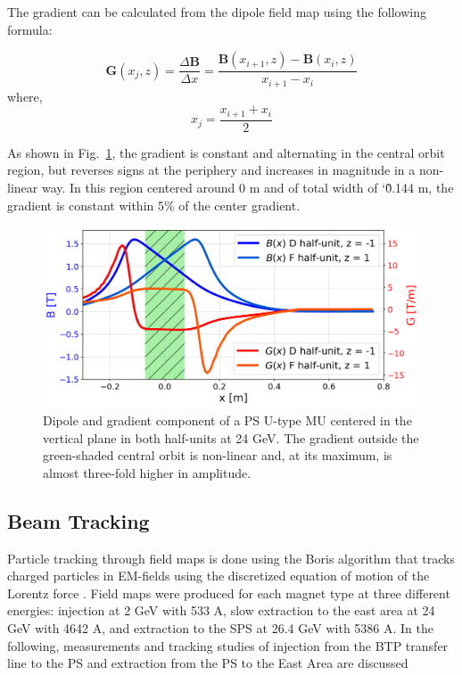 \documentclass[a4paper,
               biblatex,     %
               keeplastbox,   %
               ]{jacow}
\begin{document}
The gradient can be calculated from the dipole field map using the following formula:
 
$$ \boldsymbol{G}(x_{j},z) = \frac{\Delta\boldsymbol{B}}{\Delta x} = \frac{\boldsymbol{B}(x_{i+1},z) - \boldsymbol{B}(x_{i},z)}{x_{i+1}-x_{i}} $$
where,
$$ x_{j} = \frac{x_{i+1} + x_{i}}{{2}} $$
 
 As shown in Fig.~\ref{fig:gradient_field}, the gradient is constant and alternating in the central orbit region, but reverses signs at the periphery and increases in magnitude in a non-linear way.  In this region centered around 0 m and of total width of \char`\~0.144 m, the gradient is constant within 5\% of the center gradient.


\begin{figure}[!htb]
   \centering
   \includegraphics*[width=1.0\columnwidth, trim={0 0 0 0cm},clip]{Main_field_B_G_with_mask.png}
   \caption{Dipole and gradient component of a  PS U-type MU centered in the vertical plane in both half-units at 24 GeV. The gradient outside the green-shaded central orbit is non-linear and, at its maximum, is almost three-fold higher in amplitude.}
   \label{fig:gradient_field}
\end{figure}

\subsection{Beam Tracking}

Particle tracking through field maps is done using the Boris algorithm that tracks charged particles in EM-fields using the discretized equation of motion of the Lorentz force \cite{dutheil_pybttrackersborispy_nodate,qin_why_2013,ripperda_comprehensive_2018}. Field maps were produced for each magnet type at three different energies: injection at 2 GeV with 533 A, slow extraction to the east area at 24 GeV with 4642 A, and extraction to the SPS at 26.4 GeV with 5386 A. In the following, measurements and tracking studies of injection from the BTP transfer line to the PS and extraction from the PS to the East Area are discussed
\end{document}
